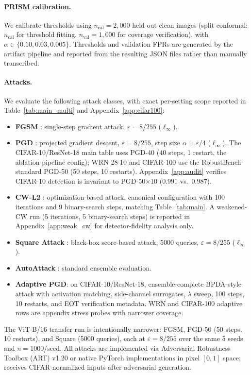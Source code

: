 \paragraph{PRISM calibration.}
We calibrate thresholds using $n_\text{cal}=2{,}000$ held-out clean images
(split conformal: $n_\text{cal}$ for threshold fitting,
$n_\text{val}=1{,}000$ for coverage verification),
with $\alpha \in \{0.10, 0.03, 0.005\}$.
Thresholds and validation FPRs are generated by the artifact pipeline and
reported from the resulting JSON files rather than manually transcribed.

\paragraph{Attacks.}
We evaluate the following attack classes, with exact per-setting scope
reported in Table~\ref{tab:main_multi} and Appendix~\ref{app:cifar100}:
\begin{itemize}[leftmargin=*,noitemsep]
  \item \textbf{FGSM} \cite{goodfellow2015explaining}: single-step gradient attack, $\varepsilon=8/255$ ($\ell_\infty$).
  \item \textbf{PGD} \cite{madry2017towards}: projected gradient descent, $\varepsilon=8/255$, step size $\alpha=\varepsilon/4$ ($\ell_\infty$). The CIFAR-10/ResNet-18 main table uses PGD-40 (40 steps, 1 restart, the ablation-pipeline config); WRN-28-10 and CIFAR-100 use the RobustBench-standard PGD-50 (50 steps, 10 restarts). Appendix~\ref{app:audit} verifies CIFAR-10 detection is invariant to PGD-50$\times$10 ($0.991$ vs.\ $0.987$).
  \item \textbf{CW-L2} \cite{carlini2017adversarial}: optimization-based attack, canonical configuration with 100 iterations and 9 binary-search steps, matching Table~\ref{tab:main}. A weakened-CW run (5 iterations, 5 binary-search steps) is reported in Appendix~\ref{app:weak_cw} for detector-fidelity analysis only.
  \item \textbf{Square Attack} \cite{andriushchenko2020square}: black-box score-based attack, 5000 queries, $\varepsilon=8/255$ ($\ell_\infty$).
  \item \textbf{AutoAttack} \cite{croce2020reliable}: standard ensemble evaluation.
  \item \textbf{Adaptive PGD}: on CIFAR-10/ResNet-18, ensemble-complete BPDA-style attack with activation matching, side-channel surrogates, $\lambda$ sweep, 100 steps, 10 restarts, and EOT verification metadata. WRN and CIFAR-100 adaptive rows are appendix stress probes with narrower coverage.
\end{itemize}
The ViT-B/16 transfer run is intentionally narrower: FGSM, PGD-50
(50 steps, 10 restarts), and Square (5000 queries), each at
$\varepsilon=8/255$ over the same 5 seeds and $n{=}1000$/seed.
All attacks are implemented via Adversarial Robustness Toolbox (ART) v1.20 
\cite{nicolae2018adversarial} or native PyTorch implementations in pixel
$[0,1]$ space; \prism receives CIFAR-normalized inputs after adversarial generation.

